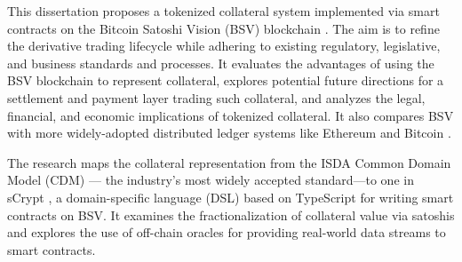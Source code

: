 This dissertation proposes a tokenized collateral system implemented via smart contracts on the Bitcoin Satoshi Vision (BSV) blockchain \citep{bsv_home}. The aim is to refine the derivative trading lifecycle while adhering to existing regulatory, legislative, and business standards and processes. It evaluates the advantages of using the BSV blockchain to represent collateral, explores potential future directions for a settlement and payment layer trading such collateral, and analyzes the legal, financial, and economic implications of tokenized collateral. It also compares BSV with more widely-adopted distributed ledger systems like Ethereum \citep{dannen2017introducing} and Bitcoin \citep{nakamoto2008bitcoin}.

The research maps the collateral representation from the ISDA Common Domain Model (CDM) \citep{isda_cdm_factsheet} — the industry's most widely accepted standard—to one in sCrypt \citep{scrypt_home}, a domain-specific language (DSL) based on TypeScript \citep{typescript_home} for writing smart contracts on BSV. It examines the fractionalization of collateral value via satoshis and explores the use of off-chain oracles for providing real-world data streams to smart contracts.